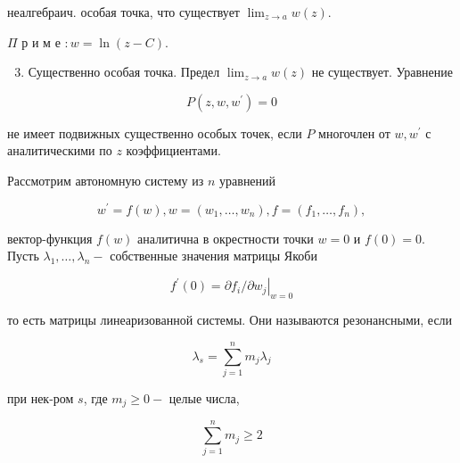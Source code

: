 \documentclass[10pt]{article}
\begin{document}
неалгебраич. особая точка, что существует $\lim _{z \rightarrow a} w(z)$.

$\Pi$ р и м е $: w=\ln (z-C)$.



\begin{enumerate}

  \setcounter{enumi}{2}

  \item Существенно особая точка. Предел $\lim _{z \rightarrow a} w(z)$ не существует. Уравнение

\end{enumerate}



\[

P\left(z, w, w^{\prime}\right)=0

\]



не имеет подвижных существенно особых точек, если $P$ многочлен от $w, w^{\prime}$ с аналитическими по $z$ коэффициентами.



Рассмотрим автономную систему из $n$ уравнений



\[

w^{\prime}=f(w), w=\left(w_{1}, \ldots, w_{n}\right), f=\left(f_{1}, \ldots, f_{n}\right),

\]



вектор-функция $f(w)$ аналитична в окрестности точки $w=0$ и $f(0)=0$. Пусть $\lambda_{1}, \ldots, \lambda_{n}-$ собственные значения матрицы Якоби



\[

f^{\prime}(0)=\partial f_{i} /\left.\partial w_{j}\right|_{w=0}

\]



то есть матрицы линеаризованной системы. Они называются резонансными, если



\[

\lambda_{s}=\sum_{j=1}^{n} m_{j} \lambda_{j}

\]



при нек-ром $s$, где $m_{j} \geqslant 0-$ целые числа,



\[

\sum_{j=1}^{n} m_{j} \geqslant 2

\]
\end{document}
